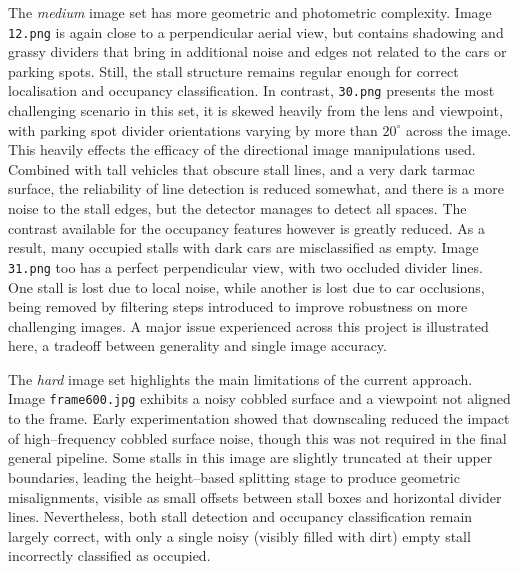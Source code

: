 \documentclass[9pt,journal]{IEEEtran}
\begin{document}
	The \emph{medium} image set has more geometric and photometric complexity. Image \texttt{12.png} is again close to a perpendicular aerial view, but contains shadowing and grassy dividers that bring in additional noise and edges not related to the cars or parking spots. Still, the stall structure remains regular enough for correct localisation and occupancy classification. In contrast, \texttt{30.png} presents the most challenging scenario in this set, it is skewed heavily from the lens and viewpoint, with parking spot divider orientations varying by more than $20^{\circ}$ across the image. This heavily effects the efficacy of the directional image manipulations used. Combined with tall vehicles that obscure stall lines, and a very dark tarmac surface, the reliability of line detection is reduced somewhat, and there is a more noise to the stall edges, but the detector manages to detect all spaces. The contrast available for the occupancy features however is greatly reduced. As a result, many occupied stalls with dark cars are misclassified as empty. Image \texttt{31.png} too has a perfect perpendicular view, with two occluded divider lines. One stall is lost due to local noise, while another is lost due to car occlusions, being removed by filtering steps introduced to improve robustness on more challenging images. A major issue experienced across this project is illustrated here, a tradeoff between generality and single image accuracy. 
	
	The \emph{hard} image set highlights the main limitations of the current approach. Image \texttt{frame600.jpg} exhibits a noisy cobbled surface and a viewpoint not aligned to the frame. Early experimentation showed that downscaling reduced the impact of high--frequency cobbled surface noise, though this was not required in the final general pipeline. Some stalls in this image are slightly truncated at their upper boundaries, leading the height--based splitting stage to produce geometric misalignments, visible as small offsets between stall boxes and horizontal divider lines. Nevertheless, both stall detection and occupancy classification remain largely correct, with only a single noisy (visibly filled with dirt) empty stall incorrectly classified as occupied.
	
\end{document}
